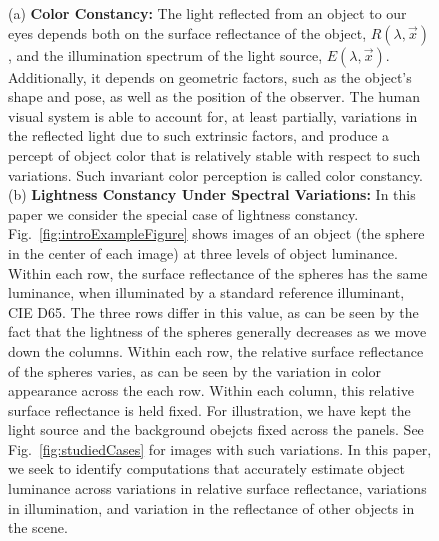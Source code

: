 \documentclass{jov}
\begin{document}
\begin{figure}
    \caption{(a) {\bf Color Constancy:} The light reflected from an object to our eyes depends both on the surface reflectance of the object, $R(\lambda,\vec{x})$, and the illumination spectrum of the light source, $E(\lambda,\vec{x})$. Additionally, it depends on geometric factors, such as the object's shape and pose, as well as the position of the observer. The human visual system is able to account for, at least partially, variations in the reflected light due to such extrinsic factors, and produce a percept of object color that is relatively stable with respect to such variations. Such invariant color perception is called color constancy. (b) {\bf Lightness Constancy Under Spectral Variations:} In this paper we consider the special case of lightness constancy. Fig.~\ref{fig:introExampleFigure} shows images of an object (the sphere in the center of each image) at three levels of object luminance. Within each row, the surface reflectance of the spheres has the same luminance, when illuminated by a standard reference illuminant, CIE D65. The three rows differ in this value, as can be seen by the fact that the lightness of the spheres generally decreases as we move down the columns. Within each row, the relative surface reflectance of the spheres varies, as can be seen by the variation in color appearance across the each row.  Within each column, this relative surface reflectance is held fixed. For illustration, we have kept the light source and the background obejcts fixed across the panels. See Fig.~\ref{fig:studiedCases} for images with such variations. In this paper, we seek to identify computations that accurately estimate object luminance across variations in relative surface reflectance, variations in illumination, and variation in the reflectance of other objects in the scene.}
 \end{figure}
\end{document}
